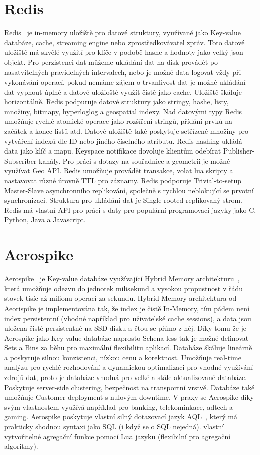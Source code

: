 \documentclass[czech,bachelor,dept460,male,csharp,cpdeclaration]{diploma}
\begin{document}
	\section{Redis}
	
	Redis~\cite{redis} je in-memory uložiště pro datové struktury, využívané jako Key-value databáze, cache, streaming engine nebo zprostředkovávatel zpráv. Toto datové uložiště má skvělé využití pro klíče v podobě hashe a hodnoty jako velký json objekt. Pro perzistenci dat můžeme ukládání dat na disk provádět po nasatvitelných pravidelných intervalech, nebo je možné data logovat vždy při vykonávání operací, pokud nemáme zájem o trvanlivost dat je možné ukládání dat vypnout úplně a datové uložioště využít čistě jako cache. Uložiště škáluje horizontálně. Redis podpuruje datové struktury jako stringy, hashe, listy, množiny, bitmapy, hyperloglog a geospatial indexy. Nad datovými typy Redis umožňuje rychlé atomické operace jako rozšíření stringů, přídání prvků na začátek a konec listů atd. Datové uložiště také poskytuje setřízené množiny pro vytváření indexů dle ID nebo jiného číselného atributu. Redis hashing ukládá data jako klíč a mapu. Keyspace notifikace dovoluje klientům odebírat Publisher-Subscriber kanály. Pro práci s dotazy na souřadnice a geometrii je možné využívat Geo API. Redis umožňuje provádět transakce, volat lua skripty a nastavovat různé úrovně TTL pro záznamy. Redis podporuje Trivial-to-setup Master-Slave asynchronního replikování, společně s rychlou neblokující se prvotní synchronizaci. Struktura pro ukládání dat je Single-rooted replikovaný strom. Redis má vlastní API pro práci s daty pro populární programovací jazyky jako C, Python, Java a Javascript.
			
	\section{Aerospike}
	
	Aerospike~\cite{aerospike} je Key-value databáze využívající Hybrid Memory architekturu~\cite{hybmem-arch}, která umožňuje odezvu do jednotek milisekund a vysokou propustnost v řádu stovek tisíc až milionu operací za sekundu. Hybrid Memory architektura od Aeorispike je implementována tak, že index je čistě In-Memory, tím pádem není index persistentní (vhodné například pro uživatelské cache sessions), a data jsou uložena čistě persistentně na SSD disku a čtou se přímo z něj. Díky tomu že je Aerospike jako Key-value databáze naprosto Schena-less tak je možné definovat Sets a Bins za běhu pro maximální flexibilitu aplikací. Databáze škáluje lineárně a poskytuje silnou konzistenci, nízkou cenu a korektnost. Umožňuje real-time analýzu pro rychlé rozhodování a dynamickou optimalizaci pro vhodné využívání zdrojů dat, proto je databáze vhodná pro velké a stále aktualizované databáze. Poskytuje server-side clustering, bezpečnost na transportní vrstvě. Databáze také umožňuje Customer deployment s nulovým downtime. V praxy se Aerospike díky svým vlastnostem využívá například pro banking, telekominkace, adtech a gaming. Aerospike poskytuje vlastní silný dotazovací jazyk AQL~\cite{aql}, který má prakticky shodnou syntaxi jako SQL (i když se o SQL nejedná). vlastní vytvořitelné agregační funkce pomocí Lua jazyku (flexibilní pro agregační algoritmy).
	
\end{document}
